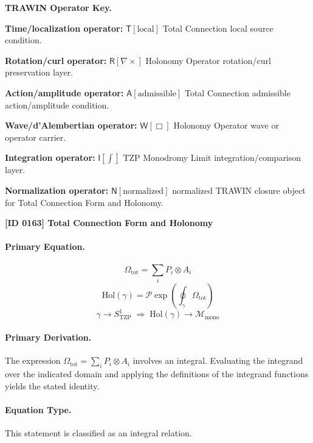 \par\vspace{0.45\baselineskip}
\noindent\begin{minipage}[t]{\linewidth}
\begingroup
\small
\raggedright
\textbf{TRAWIN Operator Key.}\par
\noindent\textbf{Time/localization operator:} $\mathsf{T}\!\left[\mathrm{local}\right]$ Total Connection local source condition.\par
\noindent\textbf{Rotation/curl operator:} $\mathsf{R}\!\left[\nabla\times\right]$ Holonomy Operator rotation/curl preservation layer.\par
\noindent\textbf{Action/amplitude operator:} $\mathsf{A}\!\left[\mathrm{admissible}\right]$ Total Connection admissible action/amplitude condition.\par
\noindent\textbf{Wave/d'Alembertian operator:} $\mathsf{W}\!\left[\Box\right]$ Holonomy Operator wave or operator carrier.\par
\noindent\textbf{Integration operator:} $\mathsf{I}\!\left[\int\right]$ TZP Monodromy Limit integration/comparison layer.\par
\noindent\textbf{Normalization operator:} $\mathsf{N}\!\left[\mathrm{normalized}\right]$ normalized TRAWIN closure object for Total Connection Form and Holonomy.\par
\endgroup
\end{minipage}

\clearpage
\noindent\textbf{[ID 0163] Total Connection Form and Holonomy}\par
\vspace{0.35em}
\paragraph{Primary Equation.}
\[
\Omega_{\mathrm{tot}}=\sum_i P_i\otimes A_i
\]
\[
\mathrm{Hol}(\gamma)=\mathcal{P}\exp\!\left(\oint_{\gamma}\Omega_{\mathrm{tot}}\right)
\]
\[
\gamma\to S^1_{\mathrm{TZP}}
\;\Longrightarrow\;
\mathrm{Hol}(\gamma)\to \mathcal{M}_{\mathrm{mono}}
\]

\paragraph{Primary Derivation.}
The expression \( \Omega_{\mathrm{tot}}=\sum_i P_i\otimes A_i \) involves an integral. Evaluating the integrand over the indicated domain and applying the definitions of the integrand functions yields the stated identity.
\paragraph{Equation Type.}
This statement is classified as an integral relation.

